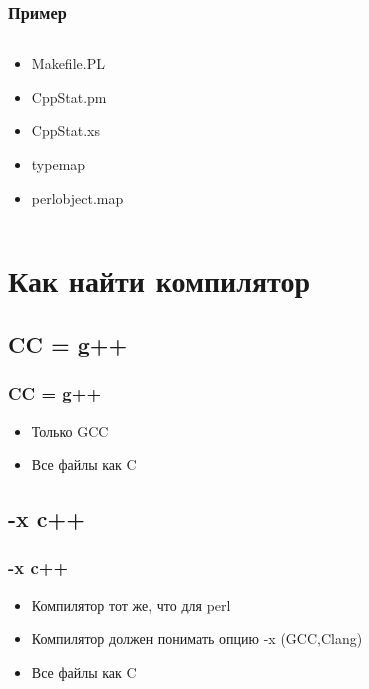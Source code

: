 \documentclass[pdflatex,hyperref={unicode=true}]{beamer}
\DeclareRobustCommand{\cpp}{
    \texorpdfstring{\hbox{C\hspace{-0.5ex}\protect\raisebox{0.5ex}{\protect\scalebox{0.67}{++}}}}{C++}
}
\begin{document}
\begin{frame}[t,fragile]
    \frametitle{Пример}
    \begin{columns}[t]
        \begin{column}{.3\textwidth}
            \begin{itemize}
                \item<alert@1> Makefile.PL
                \item<alert@2> CppStat.pm
                \item<alert@3-5> CppStat.xs
                \item typemap
                \item perlobject.map
            \end{itemize}
        \end{column}
        \begin{column}{.8\textwidth}
            \only<1>{  }
            \only<2>{  }
        \end{column}
    \end{columns}
\end{frame}


\section{Как найти компилятор}

\subsection{CC = g++}
\begin{frame}[fragile]
    \frametitle{CC = g++}
    
    \begin{itemize}
        \item Только GCC
        \item Все файлы как \cpp 
    \end{itemize}
\end{frame}

\subsection{-x c++}
\begin{frame}[fragile]
    \frametitle{-x c++}
    
    \begin{itemize}
        \item Компилятор тот же, что для perl
        \item Компилятор должен понимать опцию -x (GCC,Clang)
        \item Все файлы как \cpp 
    \end{itemize}
\end{frame}
\end{document}
